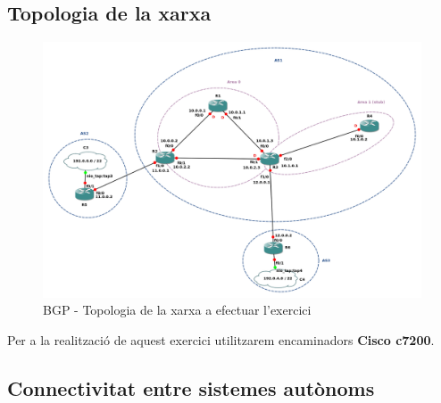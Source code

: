 \documentclass[10pt]{article}
\begin{document}
\subsection{Topologia de la xarxa}
\begin{figure}[H]
\begin{center}
\includegraphics[scale=0.5]{Images/bgp.png}
\caption{BGP - Topologia de la xarxa a efectuar l'exercici}
\end{center}
\end{figure}
Per a la realització de aquest exercici utilitzarem encaminadors \textbf{Cisco c7200}.
\subsection{Connectivitat entre sistemes autònoms}
\end{document}
